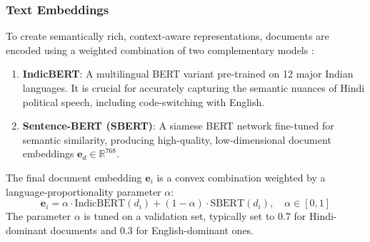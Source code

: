 \documentclass[11pt]{article}
\begin{document}
\subsubsection{Text Embeddings}
To create semantically rich, context-aware representations, documents are encoded using a weighted combination of two complementary models \cite{paul2024, manna2022}:
\begin{enumerate}[leftmargin=*, itemsep=0pt, topsep=4pt]
    \item \textbf{IndicBERT}: A multilingual BERT variant pre-trained on 12 major Indian languages. It is crucial for accurately capturing the semantic nuances of Hindi political speech, including code-switching with English.
    \item \textbf{Sentence-BERT (SBERT)}: A siamese BERT network fine-tuned for semantic similarity, producing high-quality, low-dimensional document embeddings $\mathbf{e}_d \in \mathbb{R}^{768}$.
\end{enumerate}
The final document embedding $\mathbf{e}_i$ is a convex combination weighted by a language-proportionality parameter $\alpha$:
\begin{equation}
\mathbf{e}_i = \alpha \cdot \text{IndicBERT}(d_i) + (1 - \alpha) \cdot \text{SBERT}(d_i), \quad \alpha \in [0, 1]
\label{eq:combined_embedding}
\end{equation}
The parameter $\alpha$ is tuned on a validation set, typically set to 0.7 for Hindi-dominant documents and 0.3 for English-dominant ones.
\end{document}
